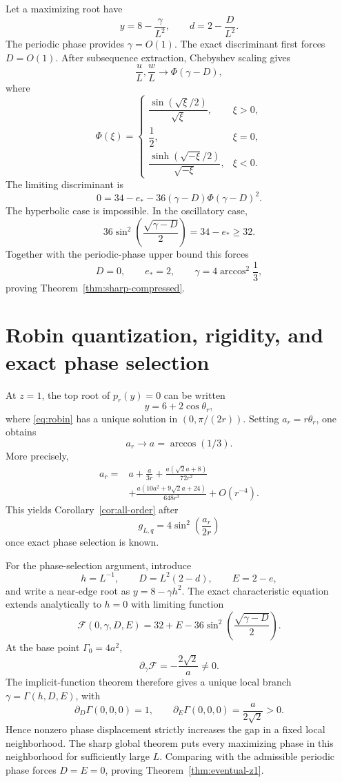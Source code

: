 \documentclass[11pt]{article}
\theoremstyle{remark}
\begin{document}
Let a maximizing root have
\[
 y=8-\frac\gamma{L^2},
 \qquad
 d=2-\frac D{L^2}.
\]
The periodic phase provides $\gamma=O(1)$.  The exact discriminant first
forces $D=O(1)$.  After subsequence extraction, Chebyshev scaling gives
\[
 \frac{u}{L},\frac{w}{L}\to
 \Phi(\gamma-D),
\]
where
\[
 \Phi(\xi)=
 \begin{cases}
 \dfrac{\sin(\sqrt\xi/2)}{\sqrt\xi},&\xi>0,\\[1ex]
 \dfrac12,&\xi=0,\\[1ex]
 \dfrac{\sinh(\sqrt{-\xi}/2)}{\sqrt{-\xi}},&\xi<0.
 \end{cases}
\]
The limiting discriminant is
\begin{equation}
 0=34-e_*-36(\gamma-D)\Phi(\gamma-D)^2.
 \label{eq:continuum-discriminant}
\end{equation}
The hyperbolic case is impossible.  In the oscillatory case,
\[
 36\sin^2\left(\frac{\sqrt{\gamma-D}}2\right)=34-e_*
 \ge32.
\]
Together with the periodic-phase upper bound this forces
\[
 D=0,
 \qquad e_*=2,
 \qquad \gamma=4\arccos^2\frac13,
\]
proving Theorem~\ref{thm:sharp-compressed}.

\section{Robin quantization, rigidity, and exact phase selection}
\label{sec:robin}

At $z=1$, the top root of $p_r(y)=0$ can be written
\[
 y=6+2\cos\theta_r,
\]
where \eqref{eq:robin} has a unique solution in $(0,\pi/(2r))$.  Setting
$a_r=r\theta_r$, one obtains
\[
 a_r\to a=\arccos(1/3).
\]
More precisely,
\[
\begin{aligned}
 a_r={}&a+\frac{a}{3r}
 +\frac{a(\sqrt2 a+8)}{72r^2}\\
 &+\frac{a(10a^2+9\sqrt2 a+24)}{648r^3}
 +O(r^{-4}).
\end{aligned}
\]
This yields Corollary~\ref{cor:all-order} after
\[
 g_{L,q}=4\sin^2\left(\frac{a_r}{2r}\right)
\]
once exact phase selection is known.

For the phase-selection argument, introduce
\[
 h=L^{-1},
 \qquad
 D=L^2(2-d),
 \qquad
 E=2-e,
\]
and write a near-edge root as $y=8-\gamma h^2$.  The exact characteristic
equation extends analytically to $h=0$ with limiting function
\[
 \mathcal F(0,\gamma,D,E)
 =32+E-36\sin^2\left(\frac{\sqrt{\gamma-D}}2\right).
\]
At the base point $\Gamma_0=4a^2$,
\[
 \partial_\gamma\mathcal F=-\frac{2\sqrt2}{a}\ne0.
\]
The implicit-function theorem therefore gives a unique local branch
$\gamma=\Gamma(h,D,E)$, with
\[
 \partial_D\Gamma(0,0,0)=1,
 \qquad
 \partial_E\Gamma(0,0,0)=\frac{a}{2\sqrt2}>0.
\]
Hence nonzero phase displacement strictly increases the gap in a fixed local
neighborhood.  The sharp global theorem puts every maximizing phase in this
neighborhood for sufficiently large $L$.  Comparing with the admissible
periodic phase forces $D=E=0$, proving Theorem~\ref{thm:eventual-z1}.
\end{document}
